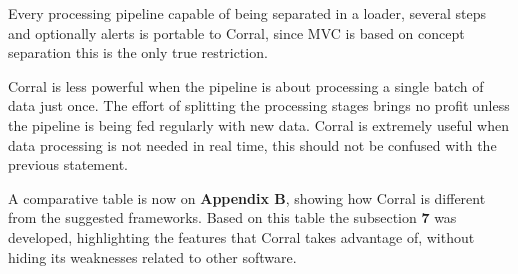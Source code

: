 \documentclass[a4paper,onecolumn,fleqn,usenatbib,useAMS]{mnrasr}
\begin{document}
%
Every processing pipeline capable of being separated in a loader, several steps
and optionally alerts is portable to Corral, since MVC is based on concept
separation this is the only true restriction.  

Corral is less powerful when the pipeline is about processing a 
single batch of data just once. 
%
The effort of splitting the processing stages brings no profit unless the pipeline is being
fed regularly with new data. 
%
Corral is extremely useful when data processing is not needed in real time, 
this should not be confused with the previous statement.  

A comparative table is now on \textbf{Appendix B}, showing how Corral is different from
the suggested frameworks. 
%
Based on this table the subsection \textbf{7} was developed,
highlighting the features that Corral takes advantage of, without hiding its
weaknesses related to other software.
\end{document}

